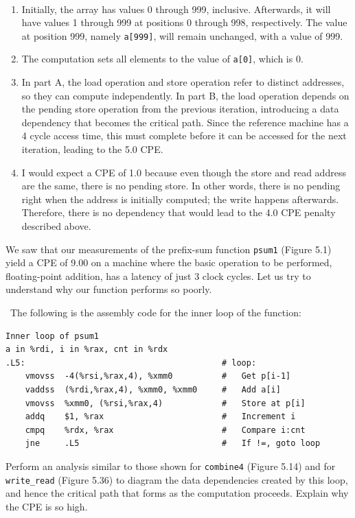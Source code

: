 \documentclass[12pt]{article}
\newenvironment{ex}[2][Exercise]{\begin{trivlist}
		\item[\hskip \labelsep {\bfseries #1}\hskip \labelsep {\bfseries #2.}]}{\end{trivlist}}
\newenvironment{sol}[1][Solution]{\begin{trivlist}
		\item[\hskip \labelsep {\bfseries #1:}]}{\end{trivlist}}
\begin{document}
\begin{sol}
	\
	\begin{enumerate}[label=(\alph*)]
		\item Initially, the array has values 0 through 999, inclusive. Afterwards, it will
		have values 1 through 999 at positions 0 through 998, respectively. The value at position
		999, namely \texttt{a[999]}, will remain unchanged, with a value of 999.
		\item The computation sets all elements to the value of \texttt{a[0]}, which is 0.
		\item In part A, the load operation and store operation refer to distinct addresses,
		so they can compute independently. In part B, the load operation depends on the pending
		store operation from the previous iteration, introducing a data dependency that becomes
		the critical path. Since the reference machine has a 4 cycle access time, this must
		complete before it can be accessed for the next iteration, leading to the 5.0 CPE.
		\item I would expect a CPE of 1.0 because even though the store and read address
		are the same, there is no pending store. In other words, there is no pending right
		when the address is initially computed; the write happens afterwards. Therefore,
		there is no dependency that would lead to the 4.0 CPE penalty described above.
	\end{enumerate}
\end{sol}

\begin{ex}{5.11}
	We saw that our measurements of the prefix-sum function \texttt{psum1} (Figure 5.1) yield
	a CPE of 9.00 on a machine where the basic operation to be performed, floating-point addition,
	has a latency of just 3 clock cycles. Let us try to understand why our function performs so
	poorly.
	
	\
	The following is the assembly code for the inner loop of the function:
	\begin{lstlisting}[language={}]
Inner loop of psum1
a in %rdi, i in %rax, cnt in %rdx
.L5:										# loop:
	vmovss	-4(%rsi,%rax,4), %xmm0			# 	Get p[i-1]
	vaddss	(%rdi,%rax,4), %xmm0, %xmm0		# 	Add a[i]
	vmovss	%xmm0, (%rsi,%rax,4)			#	Store at p[i]
	addq	$1, %rax						#	Increment i
	cmpq	%rdx, %rax						#	Compare i:cnt
	jne		.L5								#	If !=, goto loop
	\end{lstlisting}
	Perform an analysis similar to those shown for \texttt{combine4} (Figure 5.14) and for
	\texttt{write\_read} (Figure 5.36) to diagram the data dependencies created by this loop,
	and hence the critical path that forms as the computation proceeds. Explain why the CPE is
	so high.
\end{ex}
\end{document}

